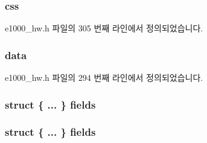 \subsubsection[{\texorpdfstring{css}{css}}]{ css}\hypertarget{structe1000__tx__desc_aadcf186346fdf291556fece37005b30c}{}\label{structe1000__tx__desc_aadcf186346fdf291556fece37005b30c}


e1000\+\_\+hw.\+h 파일의 305 번째 라인에서 정의되었습니다.

\subsubsection[{\texorpdfstring{data}{data}}]{ data}\hypertarget{structe1000__tx__desc_afc5d3d82c86bd8827a6251a93986acf8}{}\label{structe1000__tx__desc_afc5d3d82c86bd8827a6251a93986acf8}


e1000\+\_\+hw.\+h 파일의 294 번째 라인에서 정의되었습니다.

\subsubsection[{\texorpdfstring{fields}{fields}}]{\setlength{\rightskip}{0pt plus 5cm}struct \{ ... \}   fields}\hypertarget{structe1000__tx__desc_af8671022b19abb0f0773f3e733654746}{}\label{structe1000__tx__desc_af8671022b19abb0f0773f3e733654746}
\subsubsection[{\texorpdfstring{fields}{fields}}]{\setlength{\rightskip}{0pt plus 5cm}struct \{ ... \}   fields}\hypertarget{structe1000__tx__desc_a784a603c692747097c58fa4011c3761d}{}\label{structe1000__tx__desc_a784a603c692747097c58fa4011c3761d}
